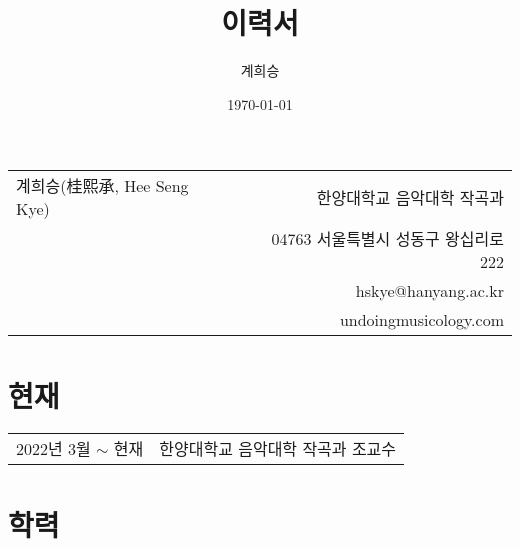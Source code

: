 \documentclass[dvipdfmx,a4paper]{article}
\title{이력서}
\author{계희승}
\date{\today}
\begin{document}
  \renewcommand{\headrulewidth}{0pt}
  \fancyhf{}
  \fancyfoot[RE,RO]{\small \thepage}
  
  \hspace*{-0.8cm}
  \begin{tabular}{p{8.2cm} r}
    {\large 계희승(桂熙承, Hee Seng Kye)} & 한양대학교 음악대학 작곡과\\
    & 04763 서울특별시 성동구 왕십리로 222\\
    & hskye@hanyang.ac.kr\\
    & undoingmusicology.com
  \end{tabular}
  
  \vspace{15mm}
  
  \section*{\normalsize 현재}
  
  \hspace*{-0.25cm}
  \begin{tabular}{p{4.0cm} l}
    2022년 3월 $\sim$ 현재 & 한양대학교 음악대학 작곡과 조교수
  \end{tabular}
  
  \vspace*{2.5mm}
  
  \section*{\normalsize 학력}
  
\end{document}
